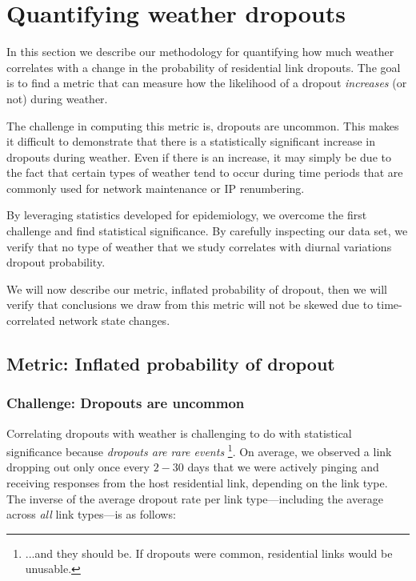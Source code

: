 \section{Quantifying weather dropouts}
\label{sec:method}

In this section we describe our methodology for quantifying how much weather
correlates with a change in the probability of residential link dropouts.
%
The goal is to find a metric that can measure how the likelihood of a dropout
\emph{increases} (or not) during weather.

The challenge in computing this metric is, dropouts are uncommon.
%
This makes it difficult to demonstrate that there is a statistically
significant increase in dropouts during weather.
%
Even if there is an increase, it may simply be due to the fact that certain
types of weather tend to occur during time periods that are commonly used for
network maintenance or IP renumbering.

By leveraging statistics developed for epidemiology, we overcome the first
challenge and find statistical significance.
%
By carefully inspecting our data set, we verify that no type of weather that we
study correlates with diurnal variations dropout probability.

We will now describe our metric, inflated probability of dropout, then we will
verify that conclusions we draw from this metric will not be skewed due to
time-correlated network state changes.

\subsection{Metric: Inflated probability of dropout} %
\label{sec:hazard}

\subsubsection*{Challenge: Dropouts are uncommon}
%
Correlating dropouts with weather is challenging to do with statistical
significance because \emph{dropouts are rare events}
%
\footnote{...and they should be. If dropouts were common, residential links
would be unusable.}.
%
On average, we observed a link dropping out only once every $2-30$ days that we
were actively pinging and receiving responses from the host residential link,
depending on the link type.
%
The inverse of the average dropout rate per link type---including the average across
\textit{all} link types---is as follows:

